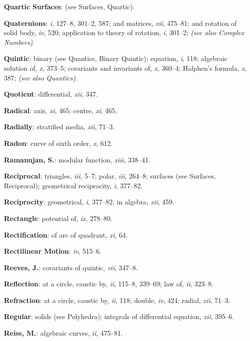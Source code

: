 \documentclass[11pt,a4paper]{article}
\newcommand{\IndexEntry}[1]{\textbf{#1}}
\newcommand{\SeeAlso}[1]{\textit{(see also #1)}}
\newcommand{\V}[1]{\textit{#1}} %
\begin{document}
\IndexEntry{Quartic Surfaces}: (see Surfaces, Quartic).

\newpage

\setcounter{page}{120}

\IndexEntry{Quaternions}: \V{i}, 127--8, 301--2, 587; and matrices, \V{xii}, 475--81; and rotation of solid body, \V{iv}, 520; application to theory of rotation, \V{i}, 301--2; \SeeAlso{Complex Numbers}.

\IndexEntry{Quintic}: binary (see Quantics, Binary Quintic); equation, \V{i}, 118; algebraic solution of, \V{x}, 373--5; covariants and invariants of, \V{x}, 360--4; Halphen's formula, \V{x}, 387; \SeeAlso{Quantics}.

\IndexEntry{Quotient}: differential, \V{xii}, 347.

\IndexEntry{Radical}: axis, \V{xi}, 465; centre, \V{xi}, 465.

\IndexEntry{Radially}: stratified media, \V{xii}, 71--3.

\IndexEntry{Radon}: curve of sixth order, \V{x}, 612.

\IndexEntry{Ramanujan, S.}: modular function, \V{xiii}, 338--41.

\IndexEntry{Reciprocal}: triangles, \V{iii}, 5--7; polar, \V{iii}, 264--8; surfaces (see Surfaces, Reciprocal); geometrical reciprocity, \V{i}, 377--82.

\IndexEntry{Reciprocity}: geometrical, \V{i}, 377--82; in algebra, \V{xii}, 459.

\IndexEntry{Rectangle}: potential of, \V{ix}, 278--80.

\IndexEntry{Rectification}: of arc of quadrant, \V{xi}, 64.

\IndexEntry{Rectilinear Motion}: \V{iv}, 515--6.

\IndexEntry{Reeves, J.}: covariants of quintic, \V{vii}, 347--8.

\IndexEntry{Reflection}: at a circle, caustic by, \V{ii}, 115--8, 339--69; law of, \V{ii}, 323--8.

\IndexEntry{Refraction}: at a circle, caustic by, \V{ii}, 118; double, \V{iv}, 424; radial, \V{xii}, 71--3.

\IndexEntry{Regular}: solids (see Polyhedra); integrals of differential equation, \V{xii}, 395--6.

\IndexEntry{Reiss, M.}: algebraic curves, \V{ii}, 475--81.
\end{document}
